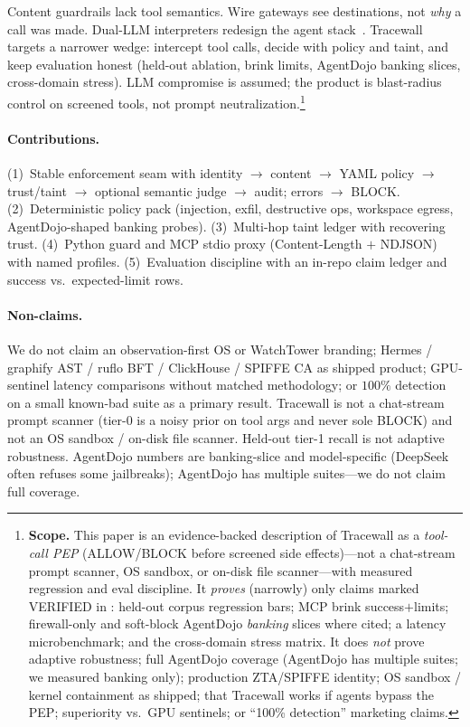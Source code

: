 \documentclass[conference]{IEEEtran}
\begin{document}
Content guardrails lack tool semantics. Wire gateways see destinations, not
\emph{why} a call was made. Dual-LLM interpreters redesign the agent stack~\cite{camel}.
Tracewall targets a narrower wedge: intercept tool calls, decide with policy and taint,
and keep evaluation honest (held-out ablation, brink limits, AgentDojo banking slices,
cross-domain stress). LLM compromise is assumed; the product is blast-radius control on
screened tools, not prompt neutralization.\footnote{%
\textbf{Scope.}
This paper is an evidence-backed description of Tracewall as a \emph{tool-call PEP}
(ALLOW/BLOCK before screened side effects)---not a chat-stream prompt scanner, OS sandbox,
or on-disk file scanner---with measured regression and eval discipline.
It \emph{proves} (narrowly) only claims marked VERIFIED in :
held-out corpus regression bars; MCP brink success$+$limits; firewall-only and
soft-block AgentDojo \emph{banking} slices where cited; a latency microbenchmark;
and the cross-domain stress matrix.
It does \emph{not} prove adaptive robustness; full AgentDojo coverage
(AgentDojo has multiple suites; we measured banking only);
production ZTA/SPIFFE identity; OS sandbox / kernel containment as shipped;
that Tracewall works if agents bypass the PEP;
superiority vs.\ GPU sentinels; or ``100\% detection'' marketing claims.}

\paragraph{Contributions.}
(1)~Stable enforcement seam with identity $\rightarrow$ content $\rightarrow$ YAML policy
$\rightarrow$ trust/taint $\rightarrow$ optional semantic judge $\rightarrow$ audit;
errors $\rightarrow$ BLOCK.
(2)~Deterministic policy pack (injection, exfil, destructive ops, workspace egress,
AgentDojo-shaped banking probes).
(3)~Multi-hop taint ledger with recovering trust.
(4)~Python guard and MCP stdio proxy (Content-Length $+$ NDJSON) with named profiles.
(5)~Evaluation discipline with an in-repo claim ledger and success vs.\ expected-limit rows.

\paragraph{Non-claims.}
We do not claim an observation-first OS or WatchTower branding; Hermes / graphify AST /
ruflo BFT / ClickHouse / SPIFFE CA as shipped product; GPU-sentinel latency comparisons
without matched methodology; or $100\%$ detection on a small known-bad suite as a primary
result. Tracewall is not a chat-stream prompt scanner (tier-0 is a noisy prior on tool args
and never sole BLOCK) and not an OS sandbox / on-disk file scanner.
Held-out tier-1 recall is not adaptive robustness. AgentDojo numbers are
banking-slice and model-specific (DeepSeek often refuses some jailbreaks); AgentDojo has
multiple suites---we do not claim full coverage.
\end{document}
